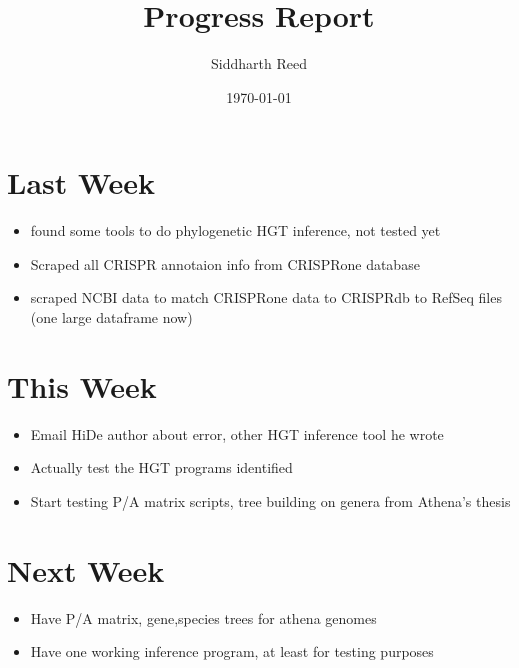 \documentclass[10pt,letter]{article}
\title{Progress Report}
\author{Siddharth Reed}
\date{\today}
\begin{document}
\maketitle

\section*{Last Week}
\begin{itemize}
    \item found some tools to do phylogenetic HGT inference, not tested yet
    \item Scraped all CRISPR annotaion info from CRISPRone database
    \item scraped NCBI data to match CRISPRone data to CRISPRdb to RefSeq files (one large dataframe now)
\end{itemize}

\section*{This Week}
\begin{itemize}
    \item Email HiDe author about error, other HGT inference tool he wrote
    \item Actually test the HGT programs identified
    \item Start testing P/A matrix scripts, tree building on genera from Athena's thesis
\end{itemize}

\section*{Next Week}
\begin{itemize}
    \item Have P/A matrix, gene,species trees for athena genomes
    \item Have one working inference program, at least for testing purposes
\end{itemize}
\end{document}
